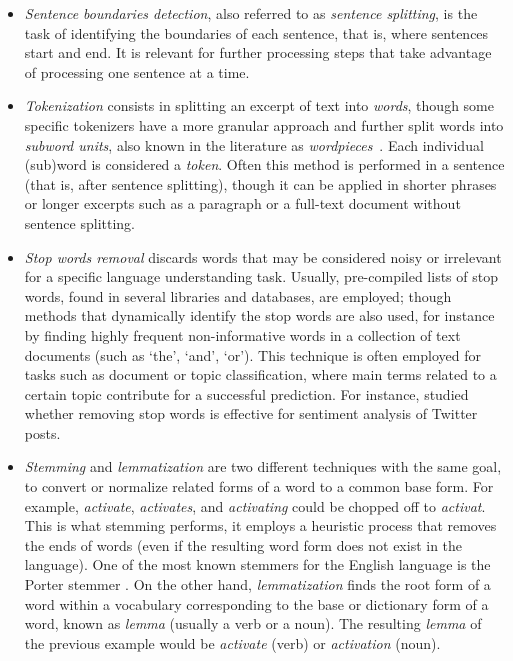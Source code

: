 \begin{itemize}

\item
\textit{Sentence boundaries detection}, also referred to as \textit{sentence splitting}, is the task of identifying the boundaries of each sentence, that is, where sentences start and end.
It is relevant for further processing steps that take advantage of processing one sentence at a time.

\item
\textit{Tokenization} consists in splitting an excerpt of text into \textit{words}, though some specific tokenizers have a more granular approach and further split words into \textit{subword units}, also known in the literature as \textit{wordpieces}~\parencite{wu2016a}.
Each individual \mbox{(sub)}word is considered a \textit{token}.
Often this method is performed in a sentence (that is, after sentence splitting), though it can be applied in shorter phrases or longer excerpts such as a paragraph or a full-text document without sentence splitting.

\item
\textit{Stop words removal} discards words that may be considered noisy or irrelevant for a specific language understanding task.
Usually, pre-compiled lists of stop words, found in several  libraries and databases, are employed; though methods that dynamically identify the stop words are also used, for instance by finding highly frequent non-informative words in a collection of text documents (such as `the', `and', `or').
This technique is often employed for tasks such as document or topic classification, where main terms related to a certain topic contribute for a successful prediction.
For instance, \textcite{saif2014a} studied whether removing stop words is effective for sentiment analysis of Twitter posts.

\item
\textit{Stemming} and \textit{lemmatization} are two different techniques with the same goal, to convert or normalize related forms of a word to a common base form.
For example, \textit{activate}, \textit{activates}, and \textit{activating} could be chopped off to \textit{activat}.
This is what {stemming} performs, it employs a heuristic process that removes the ends of words (even if the resulting word form does not exist in the language).
One of the most known stemmers for the English language is the Porter stemmer \parencite{porter1980a}.
On the other hand, \textit{lemmatization} finds the root form of a word within a vocabulary corresponding to the base or dictionary form of a word, known as \textit{lemma} (usually a verb or a noun).
The resulting \textit{lemma} of the previous example would be \textit{activate} (verb) or \textit{activation} (noun).


\end{itemize}
